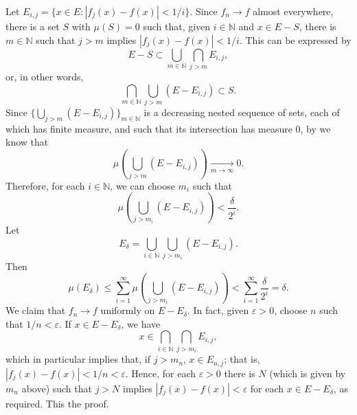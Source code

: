 \documentclass[12pt]{article}
\renewcommand{\cap}{\bigcap}
\renewcommand{\cup}{\bigcup}
\newcommand{\N}{\mathbb{N}}
\begin{document}
Let $E_{i,j} = \{x\in E: |f_j(x) - f(x)|< 1/i\}.$ Since $f_n\to f$ almost everywhere, there is a set $S$ with $\mu(S)=0$ such that, given $i\in \N$ and $x\in E-S$, there is $m\in \N$ such that $j>m$ implies $|f_j(x)-f(x)|<1/i$. This can be expressed by 
$$E-S\subset \cup_{m\in \N} \cap_{j>m} E_{i,j},$$
or, in other words,
$$\cap_{m\in \N}\cup_{j>m} (E-E_{i,j})\subset S.$$
Since $\{\cup_{j>m} (E-E_{i,j})\}_{m\in \N}$ is a decreasing nested sequence of sets, each of which has finite measure, and such that its intersection has measure $0$, by  we know that 
$$\mu(\cup_{j>m}(E-E_{i,j}))\xrightarrow[m\to \infty]{} 0.$$
Therefore, for each $i\in \N$, we can choose $m_i$ such that 
$$\mu(\cup_{j>m_i}(E-E_{i,j})) < \frac{\delta}{2^i}.$$
Let $$E_\delta = \cup_{i\in \N}\cup_{j>m_i}(E-E_{i,j}).$$
Then $$\mu(E_\delta)\leq \sum_{i=1}^\infty \mu(\cup_{j>m_i}(E-E_{i,j})) < \sum_{i=1}^\infty \frac{\delta}{2^i} = \delta.$$
We claim that $f_n\to f$ uniformly on $E-E_\delta$. In fact, given $\varepsilon>0$, choose $n$ such that $1/n<\varepsilon$. If $x\in E-E_\delta$, we have $$x\in\cap_{i\in \N}\cap_{j>m_i}E_{i,j},$$
which in particular implies that, if $j>m_n$, $x\in E_{n,j}$; that is, $|f_j(x) - f(x)|< 1/n < \varepsilon$.
Hence, for each $\varepsilon>0$ there is $N$ (which is given by $m_n$ above) such that $j>N$ implies $|f_j(x)-f(x)|<\varepsilon$ for each $x\in E-E_\delta$, as required. This  the proof.
\end{document}

